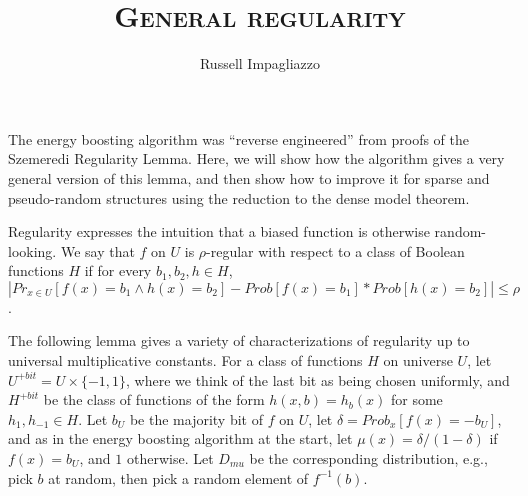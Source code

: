 \documentclass[a4paper]{article}
\title{\textsc{General regularity}}
\author{Russell Impagliazzo}
\date{}
\begin{document}
\maketitle

The energy boosting algorithm was ``reverse engineered'' from proofs of the Szemeredi Regularity
Lemma.  Here, we will show how the algorithm gives a very general version of this lemma, and then
show how to improve it for sparse and pseudo-random structures using the reduction to the dense
model theorem.  

Regularity expresses the intuition that a biased function is otherwise random-looking. We say that
$f$ on $U$ is $\rho$-regular with respect to a class of Boolean functions $H$ if for every $b_1,b_2,
h \in H$, $|Pr_{x \in U} [ f(x)=b_1 \land h(x)=b_2] - Prob[f(x)=b_1]*Prob[h(x)=b_2] | \le \rho$.

The following lemma gives a variety of characterizations of regularity up to universal
multiplicative constants. For a class of functions $H$ on universe $U$,  let $U^{+bit} = U \times
\{-1,1\}$, where we think of the last bit as being chosen uniformly, and $H^{+ bit}$ be the class of
functions of the form $h(x,b)= h_b (x)$ for some $h_1, h_{-1} \in H$.  
Let $b_U$ be the majority bit of $f$ on $U$, let $\delta = Prob_x [f(x) = - b_U]$, and as in the
energy boosting algorithm at the start, let $\mu(x) = \delta/(1-\delta)$ if $f(x) = b_U$, and $1$
otherwise.  Let $D_{mu}$ be the corresponding distribution, e.g., pick $b$ at random, then pick a
random element of $f^{-1}(b)$.  
\end{document}
